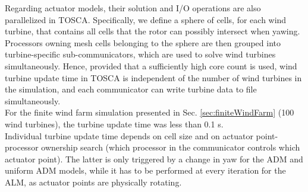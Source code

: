 \documentclass[journal abbreviation, manuscript]{copernicus}
\begin{document}
Regarding actuator models, their solution and I/O operations are also parallelized in TOSCA. Specifically, we define a sphere of cells, for each wind turbine, that contains all cells that the rotor can possibly intersect when yawing. Processors owning mesh cells belonging to the sphere are then grouped into turbine-specific sub-communicators, which are used to solve wind turbines simultaneously. Hence, provided that a sufficiently high core count is used, wind turbine update time in TOSCA is independent of the number of wind turbines in the simulation, and each communicator can write turbine data to file simultaneously. \\
For the finite wind farm simulation presented in Sec. \ref{sec:finiteWindFarm} (100 wind turbines), the turbine update time was less than 0.1 s. \\
Individual turbine update time depends on cell size and on actuator point-processor ownership search (which processor in the communicator controls which actuator point). The latter is only triggered by a change in yaw for the ADM and uniform ADM models, while it has to be performed at every iteration for the ALM, as actuator points are physically rotating.  

\noappendix 

\appendixfigures  %

\appendixtables   %

\newpage




\end{document}
